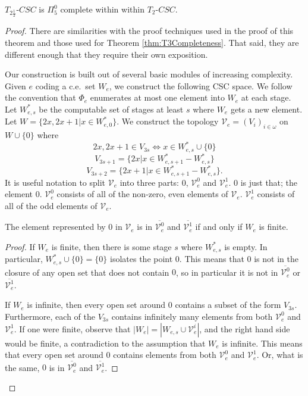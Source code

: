 \documentclass[11pt]{amsart}
\theoremstyle{remark}
\begin{document}
    \begin{theorem}
        $T_{2\frac12}$-$CSC$ is $\Pi_5^0$ complete within within $T_2$-$CSC$.
    \end{theorem}

    \begin{proof}
        There are similarities with the proof techniques used in the proof of this theorem and those used for Theorem \ref{thm:T3Completeness}.
        That said, they are different enough that they require their own exposition.

         Our construction is built out of several basic modules of increasing complexity.
         Given $e$ coding a c.e.\ set $W_e$, we construct the following CSC space.
        We follow the convention that $\Phi_e$ enumerates at most one element into $W_e$ at each stage.
        Let $W_{e,s}^*$ be the computable set of stages at least $s$ where $W_e$ gets a new element.
        Let $W=\{2x,2x+1 \vert x\in W_{e,0}^*\}$.
        We construct the topology $\mathcal{V}_e=(V_i)_{i\in\omega}$ on $W\cup\{0\}$ where
    \[2x,2x+1\in V_{3s} \iff x\in W_{e,s}^*\cup\{0\}\]\[V_{3s+1}=\{2x\vert x\in W_{e,s+1}^*-W_{e,s}^*\}\]
    \[V_{3s+2}=\{2x+1\vert x\in W_{e,s+1}^*-W_{e,s}^*\}.\]
        It is useful notation to split $\mathcal{V}_e$ into three parts: $0$, $\mathcal{V}_e^0$ and $\mathcal{V}_e^1$.
        $0$ is just that; the element $0$.
        $\mathcal{V}_e^0$ consists of all of the non-zero, even elements of $\mathcal{V}_e$.
        $\mathcal{V}_e^1$ consists of all of the odd elements of $\mathcal{V}_e$.

    
    \begin{claim}\label{claim:basicUnit1/2}
        The element represented by $0$ in $\mathcal{V}_e$ is in $\overline{\mathcal{V}_e^0}$ and $\overline{\mathcal{V}_e^1}$ if and only if $W_e$ is finite.
    \end{claim}

    \begin{proof}
    If $W_e$ is finite, then there is some stage $s$ where $W_{e,s}^*$ is empty.
    In particular, $W_{e,s}^*\cup\{0\}=\{0\}$ isolates the point $0$.
    This means that $0$ is not in the closure of any open set that does not contain $0$, so in particular it is not in $\overline{\mathcal{V}_e^0}$ or $\overline{\mathcal{V}_e^1}$.

    If $W_e$ is infinite, then every open set around $0$ contains a subset of the form $V_{3s}$.
    Furthermore, each of the $V_{3s}$ contains infinitely many elements from both $\mathcal{V}_e^0$ and $\mathcal{V}_e^1$.
    If one were finite, observe that $|W_e|=|W_{e,s}\cup \mathcal{V}_e^i|$, and the right hand side would be finite, a contradiction to the assumption that $W_e$ is infinite.
    This means that every open set around $0$ contains elements from both $\mathcal{V}_e^0$ and $\mathcal{V}_e^1$.
    Or, what is the same, $0$ is in $\overline{\mathcal{V}_e^0}$ and $\overline{\mathcal{V}_e^1}$.
    \end{proof}



\end{proof}
\end{document}
